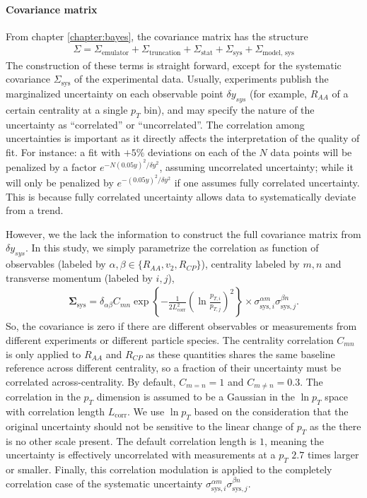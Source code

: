 \paragraph{Covariance matrix} 
From chapter \ref{chapter:bayes}, the covariance matrix has the structure
\begin{eqnarray}
\Sigma = \Sigma_{\textrm{emulator}} + \Sigma_{\textrm{truncation}} + \Sigma_{\textrm{stat}} + \Sigma_{\textrm{sys}} + \Sigma_{\textrm{model, sys}} 
\end{eqnarray}
The construction of these terms is straight forward, except for the systematic covariance $\Sigma_{\textrm{sys}}$ of the experimental data.
Usually, experiments publish the marginalized uncertainty on each observable point $\delta y_{sys}$ (for example, $R_{AA}$ of a certain centrality at a single $p_T$ bin), and may specify the nature of the uncertainty as ``correlated'' or ``uncorrelated''.
The correlation among uncertainties is important as it directly affects the interpretation of the quality of fit.
For instance: a fit with $+5\%$ deviations on each of the $N$ data points will be penalized by a factor $e^{-N(0.05 y)^2/\delta y^2}$, assuming uncorrelated uncertainty; while it will only be penalized by $e^{-(0.05 y)^2/\delta y^2}$ if one assumes fully correlated uncertainty.
This is because fully correlated uncertainty allows data to systematically deviate from a trend.

However, we the lack the information to construct the full covariance matrix from $\delta y_{sys}$.
In this study, we simply parametrize the correlation as function of observables (labeled by $\alpha, \beta \in \{R_{AA}, v_2, R_{CP}\}$), centrality labeled by $m,n$ and transverse momentum (labeled by $i,j$),
\begin{eqnarray}
\mathbf{\Sigma}_{\textrm{sys}} = \delta_{\alpha\beta} C_{mn}  \exp\left\{-\frac{1}{2 L_{\textrm{corr}}^2} \left(\ln\frac{p_{T, i}}{p_{T, j}}\right)^2 \right\} \times \sigma^{\alpha m}_{\textrm{sys}, i}\sigma^{\beta n}_{\textrm{sys}, j}.
\end{eqnarray}
So, the covariance is zero if there are different observables or measurements from different experiments or different particle species.
The centrality correlation $C_{mn}$ is only applied to $R_{AA}$ and $R_{CP}$ as these quantities shares the same baseline reference across different centrality, so a fraction of their uncertainty must be correlated across-centrality. 
By default, $C_{m=n}=1$ and $C_{m\neq n}=0.3$.
The correlation in the $p_T$ dimension is assumed to be a Gaussian in the $\ln p_T$ space with correlation length $L_{\textrm{corr}}$.
We use $\ln p_T$ based on the consideration that the original uncertainty should not be sensitive to the linear change of $p_T$ as the there is no other scale present.
The default correlation length is $1$, meaning the uncertainty is effectively uncorrelated with measurements at a $p_T$ $2.7$ times larger or smaller.
Finally, this correlation modulation is applied to the completely correlation case of the systematic uncertainty $\sigma^{\alpha m}_{\textrm{sys}, i}\sigma^{\beta n}_{\textrm{sys}, j}$.

